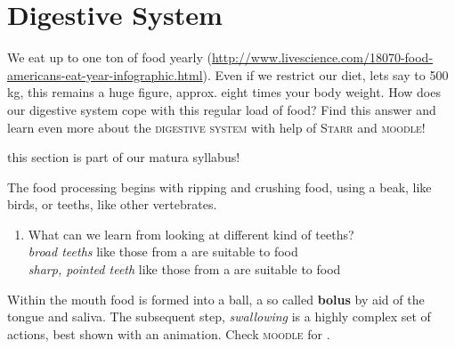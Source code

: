\areaset[0cm]{11.5cm}{26.5cm}
\section{Digestive System} \label{sec:DigestSyst} 
  We eat up to one ton of food yearly (\url{http://www.livescience.com/18070-food-americans-eat-year-infographic.html}).
 Even if we restrict our diet, lets say to 500 kg, this remains a huge figure, approx. eight times your body weight. How does our digestive system cope with this regular load of food? Find this answer and learn even more about the \textsc{digestive system} with help of   \textsc{Starr} and \Forward \textsc{moodle}!

			\begin{mdframed}[style=exampledefault, userdefinedwidth=12cm,%
					 frametitle={Starr 36.2}\label{mat:BEISPIELMATERIAL}]	  
			this section is part of our matura syllabus!
		\end{mdframed}


The food processing begins with ripping and crushing food, using a beak, like birds, or teeths, like other vertebrates. 
		\begin{enumerate}[itemsep=1.5em, leftmargin=*]
		\item  What can we learn from looking at different kind of teeths?\\
			 \emph{broad teeths} like those from a  are suitable to  food \hfill \\
			 \emph{sharp, pointed teeth} like those from a  are suitable to  food \hfill
		\end{enumerate}

Within the mouth food is formed into a ball, a so called \textbf{bolus} by aid of the tongue and saliva. The subsequent step, \emph{swallowing}
	 is a highly complex set of actions, best shown with an animation. Check \textsc{moodle} for  . 
	
